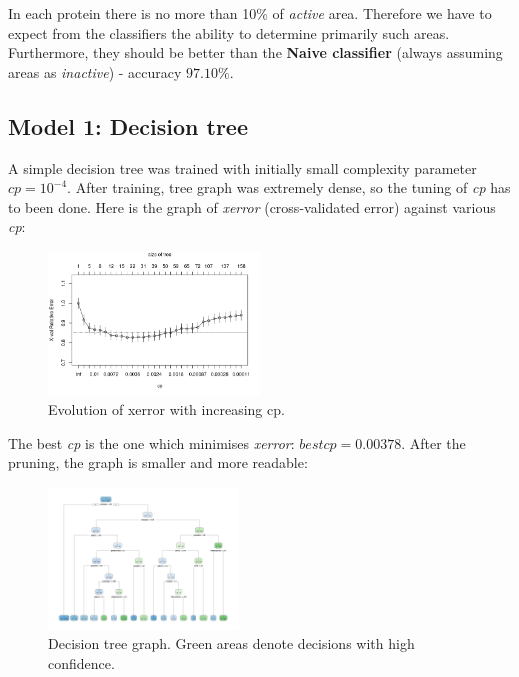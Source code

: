 \documentclass[%
 aip,
 jmp,%
 amsmath,amssymb,
 reprint,%
]{revtex4-1}
\begin{document}
In each protein there is no more than 10\% of \textit{active} area. Therefore we have to expect from the classifiers the ability to determine primarily such areas. Furthermore, they should be better than the \textbf{Naive classifier} (always assuming areas as \textit{inactive}) - accuracy $97.10\%$.

\newpage

\subsection{Model 1: Decision tree}

A simple decision tree was trained with initially small complexity parameter $cp = 10^{-4}$. After training, tree graph was extremely dense, so the tuning of \textit{cp} has to been done. Here is the graph of \textit{xerror} (cross-validated error) against various \textit{cp}:

\begin{figure}[h]
	\centering

	\includegraphics[width=0.5\textwidth]{graphics/cp.png}

	\caption{Evolution of xerror with increasing cp.}
\end{figure}

The best \textit{cp} is the one which minimises \textit{xerror}: $bestcp=0.00378$. After the pruning, the graph is smaller and more readable:

\begin{figure}[h]
	\centering

	\includegraphics[width=0.45\textwidth]{graphics/tree.png}

	\caption{Decision tree graph. Green areas denote decisions with high confidence.}
\end{figure}
\end{document}
